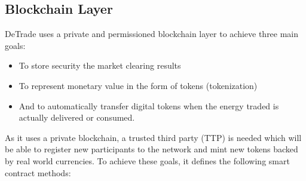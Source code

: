 \subsection{Blockchain Layer}
DeTrade uses a private and permissioned blockchain layer to achieve three main goals:
\begin{itemize}
    \item To store security the market clearing results
    \item To represent monetary value in the form of tokens (tokenization)
    \item And to automatically transfer digital tokens when the energy traded is actually delivered or consumed.
\end{itemize}
As it uses a private blockchain, a trusted third party (TTP) is needed which will be able to register new participants to the network and mint new tokens backed by real world currencies.
To achieve these goals, it defines the following smart contract methods:
